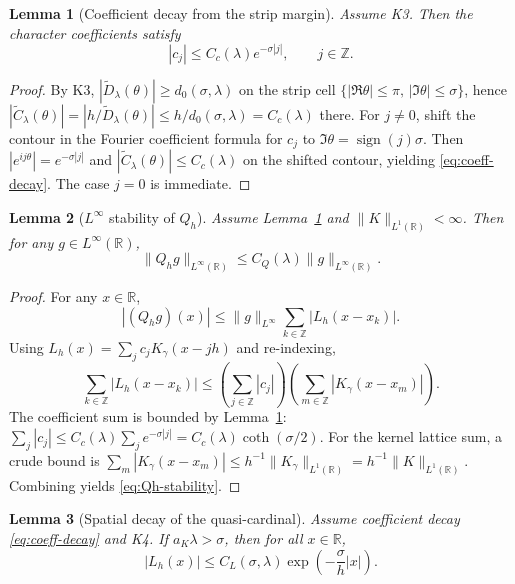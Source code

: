 \documentclass[11pt]{article}
\newtheorem{lemma}{Lemma}
\newcommand{\R}{\mathbb{R}}
\newcommand{\Z}{\mathbb{Z}}
\begin{document}
\begin{lemma}[Coefficient decay from the strip margin]
\label{lem:coeff-decay}
Assume K3. Then the character coefficients satisfy
\begin{equation}
|c_j|\le C_c(\lambda)e^{-\sigma|j|},
\qquad j\in\Z.
\label{eq:coeff-decay}
\end{equation}
\end{lemma}

\begin{proof}
By K3, $|\widetilde D_\lambda(\theta)|\ge d_0(\sigma,\lambda)$ on the strip cell $\{|\Re\theta|\le \pi,\,|\Im\theta|\le \sigma\}$, hence $|\widetilde C_\lambda(\theta)|=|h/\widetilde D_\lambda(\theta)|\le h/d_0(\sigma,\lambda)=C_c(\lambda)$ there. For $j\ne 0$, shift the contour in the Fourier coefficient formula for $c_j$ to $\Im\theta=\operatorname{sign}(j)\sigma$. Then $|e^{ij\theta}|=e^{-\sigma|j|}$ and $|\widetilde C_\lambda(\theta)|\le C_c(\lambda)$ on the shifted contour, yielding \eqref{eq:coeff-decay}. The case $j=0$ is immediate.
\end{proof}

\begin{lemma}[$L^\infty$ stability of $Q_h$]
\label{lem:Qh-stability}
Assume Lemma~\ref{lem:coeff-decay} and $\|K\|_{L^1(\R)}<\infty$. Then for any $g\in L^\infty(\R)$,
\begin{equation}
\|Q_h g\|_{L^\infty(\R)}\le C_Q(\lambda)\|g\|_{L^\infty(\R)}.
\label{eq:Qh-stability}
\end{equation}
\end{lemma}

\begin{proof}
For any $x\in\R$,
\[
|(Q_hg)(x)|\le \|g\|_{L^\infty}\sum_{k\in\Z}|L_h(x-x_k)|.
\]
Using $L_h(x)=\sum_j c_j K_\gamma(x-jh)$ and re-indexing,
\[
\sum_{k\in\Z}|L_h(x-x_k)|
\le
\left(\sum_{j\in\Z}|c_j|\right)
\left(\sum_{m\in\Z}|K_\gamma(x-x_m)|\right).
\]
The coefficient sum is bounded by Lemma~\ref{lem:coeff-decay}: $\sum_j |c_j|\le C_c(\lambda)\sum_j e^{-\sigma|j|}=C_c(\lambda)\coth(\sigma/2)$. For the kernel lattice sum, a crude bound is $\sum_m |K_\gamma(x-x_m)|\le h^{-1}\|K_\gamma\|_{L^1(\R)}=h^{-1}\|K\|_{L^1(\R)}$. Combining yields \eqref{eq:Qh-stability}.
\end{proof}

\begin{lemma}[Spatial decay of the quasi-cardinal]
\label{lem:Lh-decay}
Assume coefficient decay \eqref{eq:coeff-decay} and K4. If $a_K\lambda>\sigma$, then for all $x\in\R$,
\begin{equation}
|L_h(x)|\le C_L(\sigma,\lambda)\exp\!\left(-\frac{\sigma}{h}|x|\right).
\label{eq:Lh-spatial-decay}
\end{equation}
\end{lemma}
\end{document}

